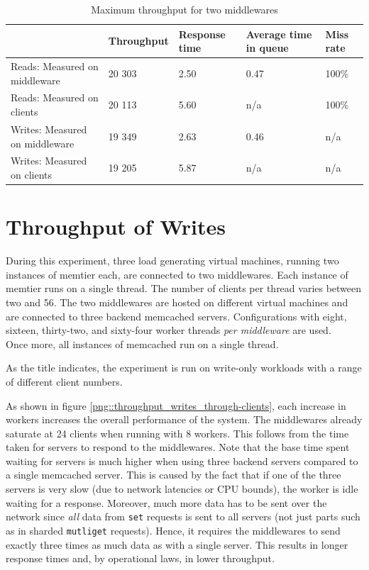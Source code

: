 \documentclass[11pt,a4paper]{article}
\begin{document}
\begin{table}[!h]
    \centering
    \begin{tabular}{|l|p{2cm}|p{2cm}|p{2cm}|p{2cm}|}
        \hline                                & Throughput & Response time & Average time in queue & Miss rate \\
        \hline Reads: Measured on middleware  &     20 303 &          2.50 &                  0.47 &     100\% \\
        \hline Reads: Measured on clients     &     20 113 &          5.60 & n/a                   &     100\% \\
        \hline Writes: Measured on middleware &     19 349 &          2.63 &                  0.46 & n/a       \\
        \hline Writes: Measured on clients    &     19 205 &          5.87 & n/a                   & n/a       \\
        \hline
    \end{tabular}
    \caption{Maximum throughput for two middlewares}
    \label{table::max_through_section_3_2mw}
\end{table}




\newpage

\section{Throughput of Writes \label{section::queue_model}}
During this experiment, three load generating virtual machines, running two instances of memtier each, are connected to two middlewares. Each instance of memtier runs on a single thread. The number of clients per thread varies between two and 56. The two middlewares are hosted on different virtual machines and are connected to three backend memcached servers. Configurations with eight, sixteen, thirty-two, and sixty-four worker threads \textit{per middleware} are used.\\
\indent Once more, all instances of memcached run on a single thread.

As the title indicates, the experiment is run on write-only workloads with a range of different client numbers.

As shown in figure \ref{png::throughput_writes_through-clients}, each increase in workers increases the overall performance of the system. The middlewares already saturate at 24 clients when running with 8 workers. This follows from the time taken for servers to respond to the middlewares. Note that the base time spent waiting for servers is much higher when using three backend servers compared to a single memcached server. This is caused by the fact that if one of the three servers is very slow (due to network latencies or CPU bounds), the worker is idle waiting for a response. Moreover, much more data has to be sent over the network since \textit{all} data from \texttt{set} requests is sent to all servers (not just parts such as in sharded \texttt{mutliget} requests). Hence, it requires the middlewares to send exactly three times as much data as with a single server. This results in longer response times and, by operational laws, in lower throughput.
\end{document}
